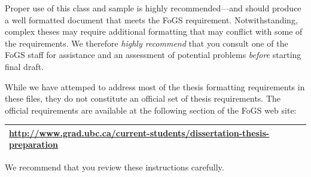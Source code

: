 \documentclass[msc,oneside]{ubcthesis}
\begin{document}
Proper use of this class and sample is highly recommended---and should
produce a well formatted document that meets the FoGS requirement.
Notwithstanding, complex theses may require additional formatting that
may conflict with some of the requirements.  We therefore \emph{highly
  recommend} that you consult one of the FoGS staff for assistance and
an assessment of potential problems \emph{before} starting final
draft.

While we have attemped to address most of the thesis formatting
requirements in these files, they do not constitute an official set of
thesis requirements.  The official requirements are available at the
following section of the FoGS web site:
\begin{center}
  \begin{tabular}{|l|}
    \hline
    \url{http://www.grad.ubc.ca/current-students/dissertation-thesis-preparation}\\
    \hline
  \end{tabular}
\end{center}
We recommend that you review these instructions carefully.
\end{document}
